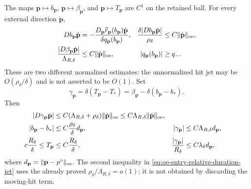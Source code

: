 \begin{lemma}
The maps
\(\mathbf p\mapsto b_{\mathbf p}\),
\(\mathbf p\mapsto\beta_{\mathbf p}\), and
\(\mathbf p\mapsto T_{\mathbf p}\) are \(C^1\) on the retained ball.
For every external direction \(\dot{\mathbf p}\),
\begin{align}
 Db_{\mathbf p}\dot{\mathbf p}
 &=-\frac{D_{\mathbf p}\widetilde r_{\mathbf p}
              (b_{\mathbf p})\dot{\mathbf p}}
          {\delta q_{\mathbf p}(b_{\mathbf p})},
 &\frac{\delta|Db_{\mathbf p}\dot{\mathbf p}|}{\rho_\delta}
 &\le C\|\dot{\mathbf p}\|_{\rm oe},           \label{eq:oe-entry-relative-hit-jet}\\
 \frac{|D\beta_{\mathbf p}\dot{\mathbf p}|}
          {\Lambda_{R,\delta}}
 &\le C\|\dot{\mathbf p}\|_{\rm oe},
 & |q_{\mathbf p}(b_{\mathbf p})|
 &\ge q_-.                                     \label{eq:oe-entry-relative-clock-jet}
\end{align}
These are two different normalized estimates: the unnormalized hit jet
may be \(O(\rho_\delta/\delta)\) and is not asserted to be \(O(1)\).
Set
\begin{equation}
 \gamma_{\mathbf p}
 =\delta(T_{\mathbf p}-T_*)
 =\beta_{\mathbf p}
       -\delta(b_{\mathbf p}-b_*).             \label{eq:oe-entry-relative-duration}
\end{equation}
Then
\begin{align}
 |D\gamma_{\mathbf p}\dot{\mathbf p}|
 &\le C(\Lambda_{R,\delta}+\rho_\delta)
       \|\dot{\mathbf p}\|_{\rm oe}
 \le C\Lambda_{R,\delta}\|\dot{\mathbf p}\|_{\rm oe},
                                                        \label{eq:oe-entry-relative-duration-jet}\\
 |b_{\mathbf p}-b_*|
 &\le C\frac{\rho_\delta}{\delta}d_{\mathbf p},&
 |\gamma_{\mathbf p}|
 &\le C\Lambda_{R,\delta}d_{\mathbf p},        \label{eq:oe-entry-relative-zero-order}\\
 c\frac{R_\delta}{\delta}
 \le T_{\mathbf p}&\le C\frac{R_\delta}{\delta},&
 \frac{|\gamma_{\mathbf p}|}{R_\delta}
 &\le C\lambda_\delta d_{\mathbf p},           \label{eq:oe-entry-relative-scales}
\end{align}
where \(d_{\mathbf p}=\|\mathbf p-p^\circ\|_{\rm oe}\).  The second
inequality in \cref{eq:oe-entry-relative-duration-jet} uses the already
proved \(\rho_\delta/\Lambda_{R,\delta}=o(1)\); it is not obtained by
discarding the moving-hit term.


\end{lemma}
